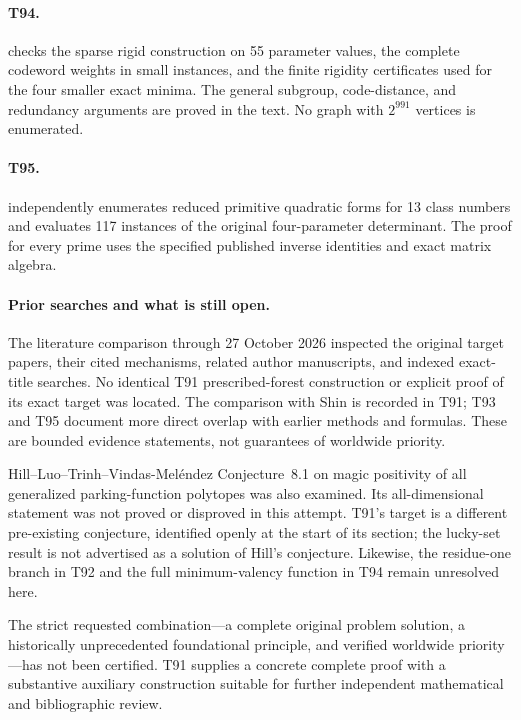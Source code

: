 \documentclass[11pt,a4paper]{article}
\theoremstyle{definition}
\theoremstyle{remark}
\begin{document}
\paragraph{T94.}
 checks the sparse rigid construction on
55 parameter values, the complete codeword weights in small instances,
and the finite rigidity certificates used for the four smaller exact
minima. The general subgroup, code-distance, and redundancy arguments
are proved in the text. No graph with $2^{991}$ vertices is enumerated.

\paragraph{T95.}
 independently enumerates reduced primitive
quadratic forms for 13 class numbers and evaluates 117 instances of the
original four-parameter determinant. The proof for every prime uses the
specified published inverse identities and exact matrix algebra.

\paragraph{Prior searches and what is still open.}
The literature comparison through 27 October 2026 inspected the original
target papers, their cited mechanisms, related author manuscripts, and
indexed exact-title searches. No identical T91 prescribed-forest
construction or explicit proof of its exact target was located. The
comparison with Shin is recorded in T91; T93 and T95 document more direct
overlap with earlier methods and formulas. These are bounded evidence
statements, not guarantees of worldwide priority.

Hill--Luo--Trinh--Vindas-Mel\'endez Conjecture~8.1 on magic positivity of
all generalized parking-function polytopes was also examined. Its
all-dimensional statement was not proved or disproved in this attempt.
T91's target is a different pre-existing conjecture, identified openly at
the start of its section; the lucky-set result is not advertised as a
solution of Hill's conjecture. Likewise, the residue-one branch in T92
and the full minimum-valency function in T94 remain unresolved here.

The strict requested combination---a complete original problem solution,
a historically unprecedented foundational principle, and verified
worldwide priority---has not been certified. T91 supplies a concrete
complete proof with a substantive auxiliary construction suitable for
further independent mathematical and bibliographic review.
\end{document}
